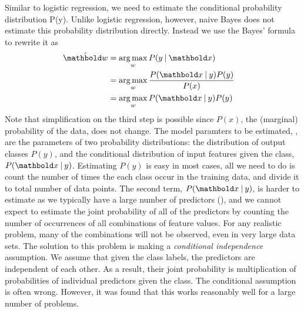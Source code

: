 Similar to logistic regression,
we need to estimate the conditional probability distribution P(y\given{}).
Unlike logistic regression,
however, naive Bayes does not estimate this probability distribution directly. 
Instead we use the Bayes' formula to rewrite it as%
\begin{align*}
  \hat{\vect{w}} &= \argmax_{w} P(y\given\vect{x}) &\\
                 &= \argmax_{w} \frac{P(\vect{x}\given{}y) P(y)}{P(x)} &\\
                 &= \argmax_{w} P(\vect{x}\given{}y) P(y) &
\end{align*}
Note that simplification on the third step is possible
since $P(x)$, the (marginal) probability of the data, does not change.
The model paramters to be estimated, , are the parameters
of two probability distributions:
the distribution of output classes $P(y)$,
and the conditional distribution of input features given the class,
$P(\vect{x}\given{}y)$.
Estimating $P(y)$ is easy in most cases,
all we need to do is count the number of times the each class occur
in the training data, and divide it to total number of data points.
The second term, $P(\vect{x}\given{}y)$, is harder to estimate 
as we typically have a large number of predictors (),
and we cannot expect to estimate the joint probability of all
of the predictors by counting the number of occurrences
of all combinations of feature values.
For any realistic problem, many of the combinations will not be observed,
even in very large data sets.%
The solution to this problem is making
a \emph{conditional independence} assumption.
We assume that given the class labels,
the predictors are independent of each other.
As a result, their joint probability is
multiplication of probabilities of individual predictors given the class.
The conditional assumption is often wrong.%
However, it was found that this works reasonably well
for a large number of problems.


